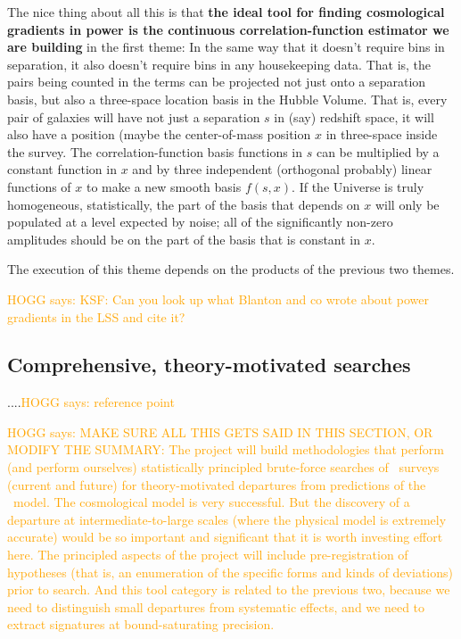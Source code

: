 \documentclass[12pt, fullpage, letterpaper]{article}
\newcommand{\HOGG}[1]{\textcolor{orange}{HOGG says: #1}}
\begin{document}
The nice thing about all this is that \textbf{the ideal tool for
  finding cosmological gradients in power is the continuous
  correlation-function estimator we are building} in the first theme:
In the same way that it doesn't require bins in separation, it also
doesn't require bins in any housekeeping data. That is, the pairs
being counted in the terms can be projected not just onto a separation
basis, but also a three-space location basis in the Hubble
Volume. That is, every pair of galaxies will have not just a
separation $s$ in (say) redshift space, it will also have a position
(maybe the center-of-mass position $x$ in three-space inside the
survey.  The correlation-function basis functions in $s$ can be
multiplied by a constant function in $x$ and by three independent (orthogonal
probably) linear functions of
$x$ to make a new smooth basis $f(s,x)$. If the Universe is truly
homogeneous, statistically, the part of the basis that depends on $x$
will only be populated at a level expected by noise; all of the
significantly non-zero amplitudes should be on the part of the basis
that is constant in $x$.

The execution of this theme depends on the products of the
previous two themes.

\HOGG{KSF: Can you look up what Blanton and co wrote about power gradients
in the LSS and cite it?}

\subsection{Comprehensive, theory-motivated searches}

....\HOGG{reference point}

\HOGG{MAKE SURE ALL THIS GETS SAID IN THIS SECTION, OR MODIFY THE SUMMARY:
The project will build methodologies that perform (and perform
ourselves) statistically principled brute-force searches of \LSS\ 
surveys (current and future) for theory-motivated departures from
predictions of the \LCDM\ model.
The cosmological model is very successful.
But the discovery of a departure at intermediate-to-large scales
(where the physical model is extremely accurate) would be so important
and significant that it is worth investing effort here.
The principled aspects of the project will include pre-registration of
hypotheses (that is, an enumeration of the specific forms and kinds of
deviations) prior to search.
And this tool category is related to the previous two, because we need
to distinguish small departures from systematic effects, and we need
to extract signatures at bound-saturating precision.}
\end{document}
